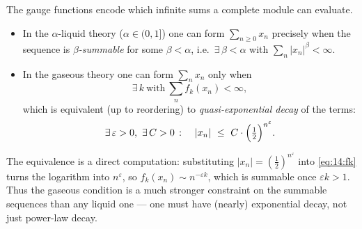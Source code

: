 \begin{remark}
\label{rmk:14:sums}
The gauge functions encode which infinite sums a complete module can evaluate.
\begin{itemize}
\item In the $\alpha$-liquid theory ($\alpha\in(0,1]$) one can form
$\sum_{n\ge 0} x_n$ precisely when the sequence is \emph{$\beta$-summable} for some
$\beta<\alpha$, i.e.\ $\exists\,\beta<\alpha$ with $\sum_n|x_n|^{\beta}<\infty$.
\item In the gaseous theory one can form $\sum_n x_n$ only when
\begin{equation*}
\exists\,k\ \text{with}\ \sum_n f_k(x_n)<\infty,
\end{equation*}
which is equivalent (up to reordering) to \emph{quasi-exponential decay} of the
terms:
\begin{equation}
\label{eq:14:quasi-exponential}
\exists\,\varepsilon>0,\ \exists\,C>0\ \colon\quad |x_n|\ \le\ C\cdot\Bigl(\tfrac12\Bigr)^{n^{\varepsilon}}.
\end{equation}
\end{itemize}
The equivalence is a direct computation: substituting $|x_n|=(\tfrac12)^{n^{\varepsilon}}$
into \eqref{eq:14:fk} turns the logarithm into $n^{\varepsilon}$, so
$f_k(x_n)\sim n^{-\varepsilon k}$, which is summable once $\varepsilon k>1$. Thus the
gaseous condition is a much stronger constraint on the summable sequences than any
liquid one --- one must have (nearly) exponential decay, not just power-law decay.
\end{remark}

\begin{center}
\end{center}

